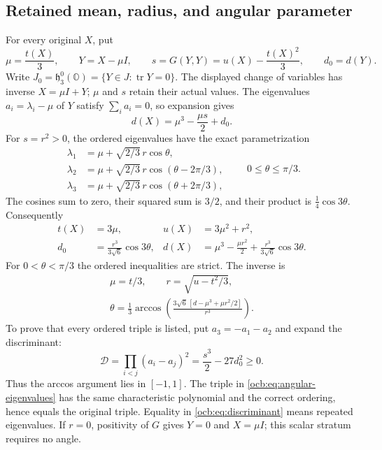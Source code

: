 \documentclass[11pt]{article}
\theoremstyle{definition}
\begin{document}
\subsection{Retained mean, radius, and angular parameter}
\label{ocb:sec:mean-radius-angle}

For every original $X$, put
\begin{equation}
 \mu=\frac{t(X)}3,\qquad Y=X-\mu I,\qquad
 s=G(Y,Y)=u(X)-\frac{t(X)^2}3,\qquad d_0=d(Y).
 \label{ocb:eq:mean-radius}\tag{OCB12}
\end{equation}
Write $J_0=\mathfrak h_3^0(\mathbb O)=\{Y\in J:\operatorname{tr}Y=0\}$.
The displayed change of variables has inverse $X=\mu I+Y$;
$\mu$ and $s$ retain their actual values. The eigenvalues
$a_i=\lambda_i-\mu$ of $Y$ satisfy $\sum_i a_i=0$, so expansion gives
\begin{equation}
 d(X)=\mu^3-\frac{\mu s}{2}+d_0.
 \label{ocb:eq:mean-determinant}\tag{OCB13}
\end{equation}
For $s=r^2>0$, the ordered eigenvalues have the exact parametrization
\begin{equation}
 \begin{aligned}
 \lambda_1&=\mu+\sqrt{2/3}\,r\cos\theta,\\
 \lambda_2&=\mu+\sqrt{2/3}\,r\cos(\theta-2\pi/3),\\
 \lambda_3&=\mu+\sqrt{2/3}\,r\cos(\theta+2\pi/3),
 \end{aligned}
 \qquad 0\le\theta\le\pi/3.
 \label{ocb:eq:angular-eigenvalues}\tag{OCB14}
\end{equation}
The cosines sum to zero, their squared sum is $3/2$, and their
product is $\tfrac14\cos3\theta$. Consequently
\begin{equation}
 \begin{aligned}
 t(X)&=3\mu,&u(X)&=3\mu^2+r^2,\\
 d_0&=\frac{r^3}{3\sqrt6}\cos3\theta,&
 d(X)&=\mu^3-\frac{\mu r^2}{2}
                    +\frac{r^3}{3\sqrt6}\cos3\theta.
 \end{aligned}
 \label{ocb:eq:angular-invariants}\tag{OCB15}
\end{equation}
For $0<\theta<\pi/3$ the ordered inequalities are strict. The inverse is
\begin{equation}
 \begin{gathered}
 \mu=t/3,\qquad r=\sqrt{u-t^2/3},\\
 \theta=\tfrac13\arccos\left(
 \frac{3\sqrt6\,[d-\mu^3+\mu r^2/2]}{r^3}\right).
 \end{gathered}
 \label{ocb:eq:angular-inverse}\tag{OCB16}
\end{equation}
To prove that every ordered triple is listed, put $a_3=-a_1-a_2$
and expand the discriminant:
\begin{equation}
 \mathcal D=\prod_{i<j}(a_i-a_j)^2
            =\frac{s^3}{2}-27d_0^2\ge0.
 \label{ocb:eq:discriminant}\tag{OCB17}
\end{equation}
Thus the arccos argument lies in $[-1,1]$. The triple in
\eqref{ocb:eq:angular-eigenvalues} has the same characteristic
polynomial and the correct ordering, hence equals the original
triple. Equality in \eqref{ocb:eq:discriminant} means repeated
eigenvalues. If $r=0$, positivity of $G$ gives $Y=0$ and $X=\mu I$;
this scalar stratum requires no angle.
\end{document}
